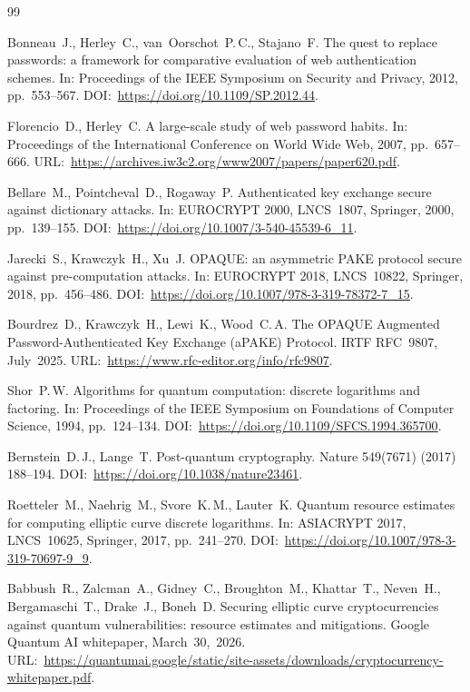 \documentclass[preprint,12pt]{elsarticle}
\theoremstyle{remark}
\begin{document}
\begin{thebibliography}{99}

Bonneau~J., Herley~C., van~Oorschot~P.\,C., Stajano~F.
The quest to replace passwords: a framework for comparative evaluation of web authentication schemes.
In: Proceedings of the IEEE Symposium on Security and Privacy, 2012, pp.~553--567.
DOI:~\url{https://doi.org/10.1109/SP.2012.44}.

Florencio~D., Herley~C.
A large-scale study of web password habits.
In: Proceedings of the International Conference on World Wide Web, 2007, pp.~657--666.
URL:~\url{https://archives.iw3c2.org/www2007/papers/paper620.pdf}.

Bellare~M., Pointcheval~D., Rogaway~P.
Authenticated key exchange secure against dictionary attacks.
In: EUROCRYPT 2000, LNCS~1807, Springer, 2000, pp.~139--155.
DOI:~\url{https://doi.org/10.1007/3-540-45539-6_11}.

Jarecki~S., Krawczyk~H., Xu~J.
OPAQUE: an asymmetric PAKE protocol secure against pre-computation attacks.
In: EUROCRYPT 2018, LNCS~10822, Springer, 2018, pp.~456--486.
DOI:~\url{https://doi.org/10.1007/978-3-319-78372-7_15}.

Bourdrez~D., Krawczyk~H., Lewi~K., Wood~C.\,A.
The OPAQUE Augmented Password-Authenticated Key Exchange (aPAKE) Protocol.
IRTF RFC~9807, July~2025.
URL:~\url{https://www.rfc-editor.org/info/rfc9807}.

Shor~P.\,W.
Algorithms for quantum computation: discrete logarithms and factoring.
In: Proceedings of the IEEE Symposium on Foundations of Computer Science, 1994, pp.~124--134.
DOI:~\url{https://doi.org/10.1109/SFCS.1994.365700}.

Bernstein~D.\,J., Lange~T.
Post-quantum cryptography.
Nature 549(7671) (2017) 188--194.
DOI:~\url{https://doi.org/10.1038/nature23461}.

Roetteler~M., Naehrig~M., Svore~K.\,M., Lauter~K.
Quantum resource estimates for computing elliptic curve discrete logarithms.
In: ASIACRYPT 2017, LNCS~10625, Springer, 2017, pp.~241--270.
DOI:~\url{https://doi.org/10.1007/978-3-319-70697-9_9}.

Babbush~R., Zalcman~A., Gidney~C., Broughton~M., Khattar~T.,
Neven~H., Bergamaschi~T., Drake~J., Boneh~D.
Securing elliptic curve cryptocurrencies against quantum vulnerabilities:
resource estimates and mitigations.
Google Quantum AI whitepaper, March~30,~2026.
URL:~\url{https://quantumai.google/static/site-assets/downloads/cryptocurrency-whitepaper.pdf}.


\end{thebibliography}
\end{document}

